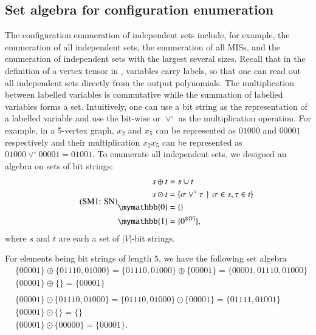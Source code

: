\documentclass[review, onefignum, onetabnum]{siamart190516}
\begin{document}
\subsection{Set algebra for configuration enumeration}

The configuration enumeration of independent sets include, for example, the enumeration of all independent sets, the enumeration of all MISs, and the enumeration of independent sets with the largest several sizes.
Recall that in the definition of a vertex tensor in , variables carry labels, so that one can read out all independent sets directly from the output polynomials.
The multiplication between labelled variables is commutative while the summation of labelled variables forms a set.
Intuitively, one can use a bit string as the representation of a labelled variable and use the bit-wise or $\lor^\circ$ as the multiplication operation.
For example, in a 5-vertex graph, $x_2$ and $x_5$ can be represented as $01000$ and $00001$ respectively and their multiplication $x_2x_5$ can be represented as $01000 \lor^\circ 00001 = 01001$.
To enumerate all independent sets, we designed an algebra on sets of bit strings:
\begin{equation}
\eqname{SN}
\begin{split}
    s \oplus t &= s \cup t\\
    s \odot t &= \{\sigma \lor^\circ \tau \, \mid \, \sigma \in s, \tau \in t\}\\
    \mymathbb{0} &= \{\}\\
    \mymathbb{1} &= \{0^{\otimes |V|}\},
\end{split}\label{eq:set}
\end{equation}
where $s$ and $t$ are each a set of $|V|$-bit strings.
\begin{example}\label{eg:setalgebra}
    For elements being bit strings of length $5$, we have the following set algebra
\begin{equation*}
\begin{split}
    &\{00001\} \oplus \{01110, 01000\} = \{01110, 01000\} \oplus \{00001\} = \{00001,01110, 01000\}\\
    &\{00001\} \oplus \{\} = \{00001\}\\
&\\
    &\{00001\} \odot \{01110, 01000\} = \{01110, 01000\} \odot \{00001\} = \{01111, 01001\}\\
    &\{00001\} \odot \{\} = \{\}\\
    &\{00001\} \odot \{00000\} = \{00001\}.
\end{split}
\end{equation*}
\end{example}
\end{document}
